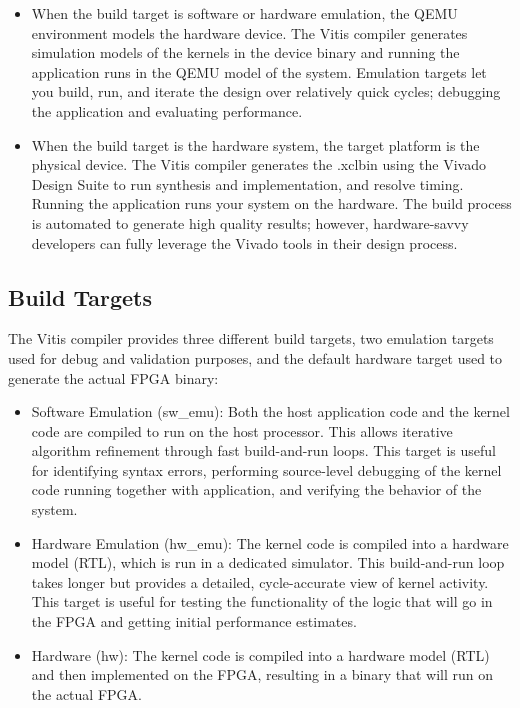 \begin{enumerate}
\begin{itemize}
        \item When the build target is software or hardware emulation, the QEMU environment models the hardware device. The Vitis compiler generates simulation models of the kernels in the device binary and running the application runs in the QEMU model of the system. Emulation targets let you build, run, and iterate the design over relatively quick cycles; debugging the application and evaluating performance.
        \item When the build target is the hardware system, the target platform is the physical device. The Vitis compiler generates the .xclbin using the Vivado Design Suite to run synthesis and implementation, and resolve timing. Running the application runs your system on the hardware. The build process is automated to generate high quality results; however, hardware-savvy developers can fully leverage the Vivado tools in their design process.
    \end{itemize}
\end{enumerate}

\subsection{Build Targets}    
The Vitis compiler provides three different build targets, two emulation targets used for debug and validation purposes, and the default hardware target used to generate the actual FPGA binary:

\begin{itemize}
    \item Software Emulation (sw\_emu): Both the host application code and the kernel code are compiled to run on the host processor. This allows iterative algorithm refinement through fast build-and-run loops. This target is useful for identifying syntax errors, performing source-level debugging of the kernel code running together with application, and verifying the behavior of the system.
    \item Hardware Emulation (hw\_emu): The kernel code is compiled into a hardware model (RTL), which is run in a dedicated simulator. This build-and-run loop takes longer but provides a detailed, cycle-accurate view of kernel activity. This target is useful for testing the functionality of the logic that will go in the FPGA and getting initial performance estimates.
    \item Hardware (hw): The kernel code is compiled into a hardware model (RTL) and then implemented on the FPGA, resulting in a binary that will run on the actual FPGA.
\end{itemize}

